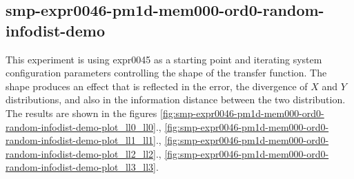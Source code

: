 \subsection*{smp-expr0046-pm1d-mem000-ord0-random-infodist-demo}
\label{sec:smp-expr0046-pm1d-mem000-ord0-random-infodist-demo}

This experiment is using expr0045 as a starting point and
iterating system configuration parameters controlling the shape of the
transfer function. The shape produces an effect that is reflected in
the error, the divergence of $X$ and $Y$ distributions, and also in the
information distance between the two distribution.
The results are shown in the figures \ref{fig:smp-expr0046-pm1d-mem000-ord0-random-infodist-demo-plot_ll0_ll0}., \ref{fig:smp-expr0046-pm1d-mem000-ord0-random-infodist-demo-plot_ll1_ll1}., \ref{fig:smp-expr0046-pm1d-mem000-ord0-random-infodist-demo-plot_ll2_ll2}., \ref{fig:smp-expr0046-pm1d-mem000-ord0-random-infodist-demo-plot_ll3_ll3}.

\newpage
{}

\newpage


